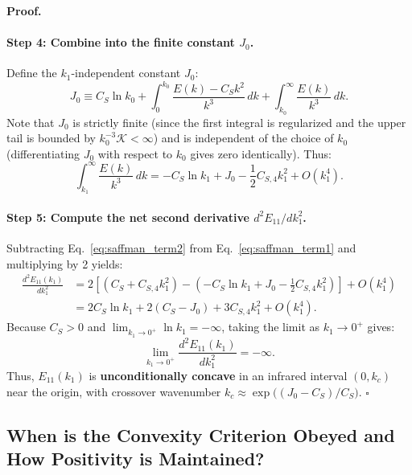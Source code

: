 \documentclass[lineno]{jfm}
\newenvironment{proof}[1][Proof]{\noindent\textbf{#1.} }{\hfill$\square$\medskip}
\begin{document}
\begin{proof}
\paragraph{Step 4: Combine into the finite constant $J_0$.}
Define the $k_1$-independent constant $J_0$:
\begin{equation}
J_0 \equiv C_S \ln k_0 + \int_0^{k_0} \frac{E(k) - C_S k^2}{k^3}\,dk + \int_{k_0}^\infty \frac{E(k)}{k^3}\,dk.
\label{eq:J0_def}
\end{equation}
Note that $J_0$ is strictly finite (since the first integral is regularized and the upper tail is bounded by $k_0^{-3}\mathcal{K} < \infty$) and is independent of the choice of $k_0$ (differentiating $J_0$ with respect to $k_0$ gives zero identically). Thus:
\begin{equation}
\int_{k_1}^\infty \frac{E(k)}{k^3}\,dk = -C_S \ln k_1 + J_0 - \frac{1}{2} C_{S,4} k_1^2 + O(k_1^4).
\label{eq:saffman_term2}
\end{equation}

\paragraph{Step 5: Compute the net second derivative $d^2 E_{11}/dk_1^2$.}
Subtracting Eq.~\eqref{eq:saffman_term2} from Eq.~\eqref{eq:saffman_term1} and multiplying by 2 yields:
\begin{align}
\frac{d^2 E_{11}(k_1)}{d k_1^2} &= 2 \left[ \left( C_S + C_{S,4} k_1^2 \right) - \left( -C_S \ln k_1 + J_0 - \frac{1}{2} C_{S,4} k_1^2 \right) \right] + O(k_1^4) \nonumber \\
&= 2 C_S \ln k_1 + 2(C_S - J_0) + 3 C_{S,4} k_1^2 + O(k_1^4).
\label{eq:saffman_d2E11_exact}
\end{align}
Because $C_S > 0$ and $\lim_{k_1 \to 0^+} \ln k_1 = -\infty$, taking the limit as $k_1 \to 0^+$ gives:
\begin{equation}
\lim_{k_1 \to 0^+} \frac{d^2 E_{11}(k_1)}{d k_1^2} = -\infty.
\end{equation}
Thus, $E_{11}(k_1)$ is \textbf{unconditionally concave} in an infrared interval $(0, k_c)$ near the origin, with crossover wavenumber $k_c \approx \exp\big((J_0 - C_S)/C_S\big)$.
\end{proof}

\subsection{When is the Convexity Criterion Obeyed and How Positivity is Maintained?}
\end{document}
